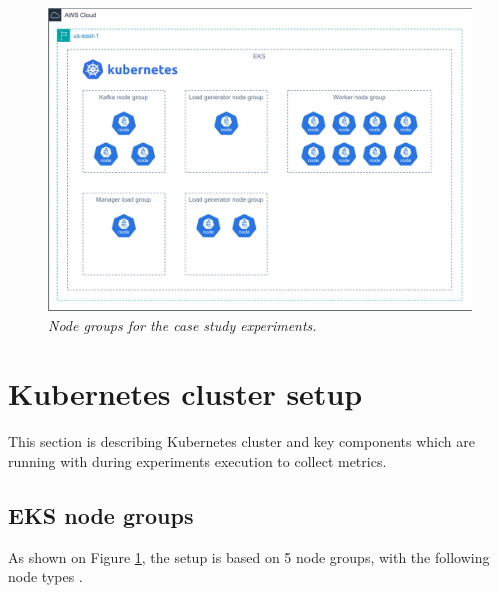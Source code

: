 \begin{figure}[ht]
    \centering
    \includegraphics[width=1\textwidth]{figures/eks-node-groups-2}
    \caption{\textit{Node groups for the case study experiments.}}
    \label{fig:node-gorups}
\end{figure}


\newpage
\section{Kubernetes cluster setup}\label{subsec:eks-cluster-configuration}
This section is describing Kubernetes cluster and key components which are running
with during experiments execution to collect metrics.

\subsection{EKS node groups}\label{node-groups}

As shown on Figure \ref{fig:node-gorups}, the setup is based on 5 node groups, with the following
node types \cite{aws_node_types}.

